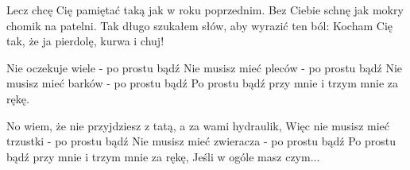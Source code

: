 \documentclass[../../../songbook.tex]{subfiles}
\begin{document}
Lecz chcę Cię pamiętać taką jak w roku poprzednim. 				 \newline
Bez Ciebie schnę jak mokry chomik na patelni. 				 \newline
Tak długo szukałem słów, aby wyrazić ten ból: 				 \newline
Kocham Cię tak, że ja pierdolę, kurwa i chuj! 				 \newline

\-\hspace{1cm} Nie oczekuje wiele - po prostu bądź				 \newline				
\-\hspace{1cm} Nie musisz mieć pleców - po prostu bądź						 \newline
\-\hspace{1cm} Nie musisz mieć barków - po prostu bądź 					 \newline	
\-\hspace{1cm} Po prostu bądź przy mnie i trzym mnie za rękę.					 \newline

No wiem, że nie przyjdziesz z tatą, a za wami hydraulik, \newline 
Więc nie musisz mieć trzustki - po prostu bądź			 \newline 
Nie musisz mieć zwieracza - po prostu bądź 				 \newline 
Po prostu bądź przy mnie i trzym mnie za rękę,			 \newline 
Jeśli w ogóle masz czym...				   				 \newline 
\end{document}
